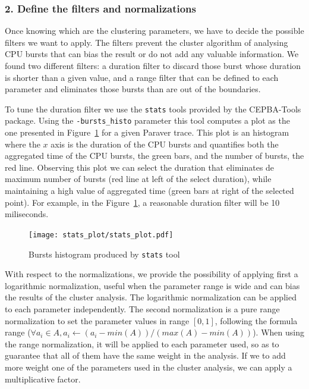 \documentclass[twoside,a4,english,11pt]{book}
\begin{document}
\subsubsection*{2. Define the filters and normalizations}

Once knowing which are the clustering parameters, we have to decide the
possible filters we want to apply. The filters prevent the cluster algorithm
of analysing CPU bursts that can bias the result or do not add any valuable
information. We found two different filters: a duration filter to discard
those burst whose duration is shorter than a given value, and a range filter
that can be defined to each parameter and eliminates those bursts than are
out of the boundaries.

To tune the duration filter we use the \texttt{stats} tools provided by the
CEPBA-Tools package. Using the \texttt{-bursts\_histo} parameter this tool
computes a plot as the one presented in Figure~\ref{fig:stats_plot} for
a given Paraver trace. This plot is an histogram where the $x$ axis is the 
duration of the CPU bursts and quantifies both the aggregated time of the 
CPU bursts, the green bars, and the number of bursts, the red line. Observing
this plot we can select the duration that eliminates de maximum number of 
bursts (red line at left of the select duration), while maintaining a high 
value of aggregated time (green bars at right of the selected point).
For example, in the Figure~\ref{fig:stats_plot}, a reasonable duration filter 
will be 10 miliseconds.

\begin{figure}
  \texttt{[image: stats\_plot/stats\_plot.pdf]}
  \caption{Bursts histogram produced by \texttt{stats} tool}
  \label{fig:stats_plot}
\end{figure}

With respect to the normalizations, we provide the possibility of applying
first a logarithmic normalization, useful when the parameter range is wide
and can bias the results of the cluster analysis. The logarithmic 
normalization can be applied to each parameter independently. The second 
normalization is a pure range normalization to set the parameter values 
in range $[0,1]$, following the formula  range 
($\forall a_{i}\in A,a_{i}\leftarrow(a_{i}-min(A))/(max(A)-min(A))$).
When using the range normalization, it will be applied to each parameter used,
so as to guarantee that all of them have the same weight in the analysis. If
we to add more weight one of the parameters used in the cluster analysis, we
can apply a multiplicative factor.
\end{document}

